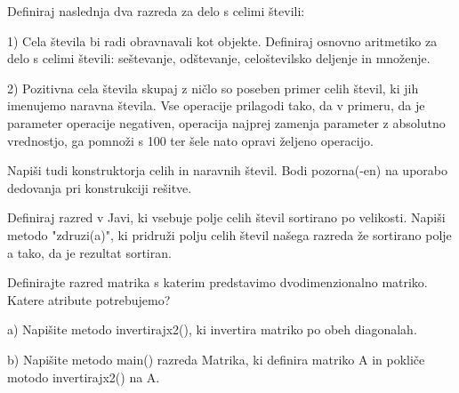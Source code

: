 \begin{ex}
Definiraj naslednja dva razreda za delo s celimi \v stevili:

1) Cela \v stevila bi radi obravnavali kot objekte. Definiraj osnovno aritmetiko za delo s celimi \v stevili: se\v stevanje, od\v stevanje, celo\v stevilsko deljenje in mno\v zenje.

2) Pozitivna cela \v stevila skupaj z ni\v clo so poseben primer celih \v stevil, ki jih imenujemo naravna \v stevila. Vse operacije prilagodi tako, da v primeru, da je parameter operacije negativen, operacija najprej zamenja parameter z absolutno vrednostjo, ga pomno\v zi s 100 ter \v sele nato opravi \v zeljeno operacijo.

Napi\v si tudi konstruktorja celih in naravnih \v stevil. Bodi pozorna(-en) na uporabo dedovanja pri konstrukciji re\v sitve.



\end{ex}
\begin{ex}
Definiraj razred v Javi, ki vsebuje polje celih \v stevil sortirano po velikosti. Napi\v si metodo "zdruzi(a)", ki pridru\v zi polju celih \v stevil na\v sega razreda \v ze sortirano polje a tako, da je rezultat sortiran.



\end{ex}
\begin{ex} 
Definirajte razred matrika s katerim predstavimo dvodimenzionalno matriko. Katere atribute potrebujemo?

a) Napi\v site metodo invertirajx2(), ki invertira matriko po obeh diagonalah.

b) Napi\v site metodo main() razreda Matrika, ki definira matriko A in pokli\v ce motodo invertirajx2() na A.



\end{ex}
